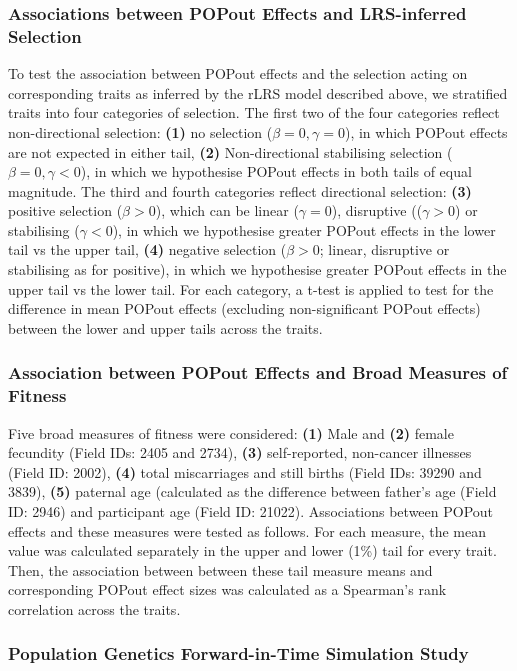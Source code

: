 \documentclass[12pt]{zHenriquesLab-StyleBioRxiv}
\begin{document}
\subsubsection*{Associations between POPout Effects and LRS-inferred Selection}
To test the association between POPout effects and the selection acting on 
corresponding traits as inferred by the rLRS model described above, we stratified 
traits into four categories of selection. The first two of the four categories reflect non-directional 
selection: \textbf{(1)} no selection ($\beta=0,\gamma=0$), in which POPout 
effects are not expected in either tail, \textbf{(2)} Non-directional stabilising 
selection ($\beta=0,\gamma<0$), in which we hypothesise POPout effects 
in both tails of equal magnitude. The third and fourth categories reflect directional selection: 
\textbf{(3)} positive selection ($\beta>0$), which can be linear ($\gamma=0$), disruptive 
(($\gamma>0$) or stabilising ($\gamma<0$), in which we hypothesise greater 
POPout effects in the lower tail vs the upper tail, \textbf{(4)} negative 
selection ($\beta>0$; linear, disruptive or stabilising as for positive), in which we 
hypothesise greater POPout effects in the upper tail vs the lower tail. For each category, 
a t-test is applied to test for the difference in mean POPout effects (excluding non-significant 
POPout effects) between the lower and upper tails across the traits.

\subsubsection*{Association between POPout Effects and Broad Measures of Fitness}
Five broad measures of fitness were considered: \textbf{(1)} Male and \textbf{(2)} female 
fecundity (Field IDs: 2405 and 2734), \textbf{(3)} self-reported, non-cancer illnesses 
(Field ID: 2002), \textbf{(4)} total miscarriages and still births (Field IDs: 39290 and 3839), 
\textbf{(5)} paternal age (calculated as the difference between father's age (Field ID: 2946) 
and participant age (Field ID: 21022). Associations between POPout effects and these 
measures were tested as follows. For each measure, the mean value was calculated 
separately in the upper and lower (1\%) tail for every trait. Then, the association between 
between these tail measure means and corresponding POPout effect sizes was 
calculated as a Spearman's rank correlation across the traits.



\subsubsection*{Population Genetics Forward-in-Time Simulation Study} \label{sec:methods:sims} 
\end{document}
